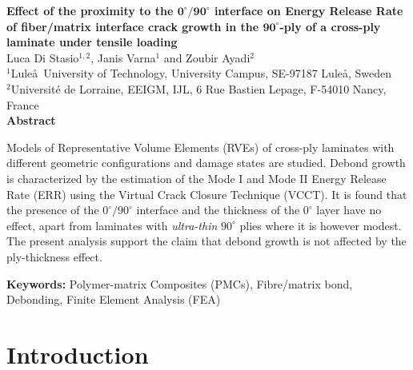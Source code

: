 \thispagestyle{plain}
\begin{center}
\Large\textbf{Effect of the proximity to the $\mathbf{0^{\circ}/90^{\circ}}$ interface on Energy Release Rate of fiber/matrix interface crack growth in the  $\mathbf{90^{\circ}}$-ply of a cross-ply laminate under tensile loading}\\
\vspace{10mm}
\normalsize Luca Di Stasio$^{1,2}$, Janis Varna$^{1}$ and Zoubir Ayadi$^{2}$\\
\vspace{5mm}
\normalsize $^{1}$Lule\aa\ University of Technology, University Campus, SE-97187 Lule\aa, Sweden\\
\normalsize $^{2}$Universit\'e de Lorraine, EEIGM, IJL, 6 Rue Bastien Lepage, F-54010 Nancy, France\\
\vspace{15mm}
\textbf{Abstract}\\
\end{center}

Models of Representative Volume Elements (RVEs) of cross-ply laminates with different geometric configurations and damage states are studied. Debond growth is characterized by the estimation of the Mode I and Mode II Energy Release Rate (ERR) using the Virtual Crack Closure Technique (VCCT). It is found that the presence of the $0^{\circ}/90^{\circ}$ interface and the thickness of the $0^{\circ}$ layer have no effect, apart from laminates with \emph{ultra-thin} $90^{\circ}$ plies where it is however modest. The present analysis support the claim that debond growth is not affected by the ply-thickness effect.

\vspace{5mm}

\textbf{Keywords:} Polymer-matrix Composites (PMCs), Fibre/matrix bond, Debonding, Finite Element Analysis (FEA)



\section{Introduction}

